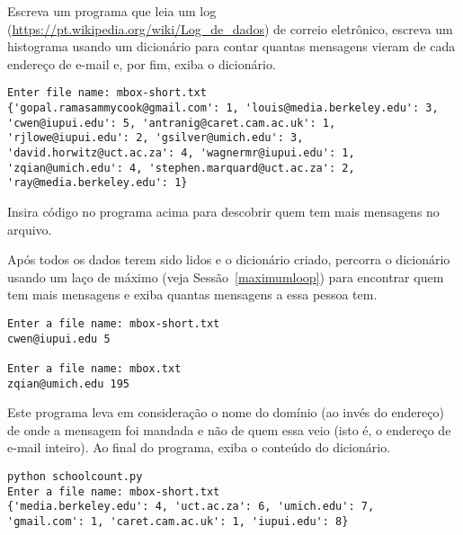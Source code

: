 \begin{ex}
Escreva um programa que leia um log (\url{https://pt.wikipedia.org/wiki/Log_de_dados}) de correio eletrônico, escreva um histograma usando um dicionário para contar quantas mensagens vieram de cada endereço de e-mail e, por fim, exiba o dicionário.

\beforeverb
\begin{verbatim}
Enter file name: mbox-short.txt
{'gopal.ramasammycook@gmail.com': 1, 'louis@media.berkeley.edu': 3,
'cwen@iupui.edu': 5, 'antranig@caret.cam.ac.uk': 1,
'rjlowe@iupui.edu': 2, 'gsilver@umich.edu': 3,
'david.horwitz@uct.ac.za': 4, 'wagnermr@iupui.edu': 1,
'zqian@umich.edu': 4, 'stephen.marquard@uct.ac.za': 2,
'ray@media.berkeley.edu': 1}
\end{verbatim}
\afterverb
\end{ex}

\begin{ex}
Insira código no programa acima para descobrir quem tem mais mensagens no arquivo.

Após todos os dados terem sido lidos e o dicionário criado, percorra o dicionário usando um laço de máximo (veja Sessão~\ref{maximumloop}) para encontrar quem tem mais mensagens e exiba quantas mensagens a essa pessoa tem.

\beforeverb
\begin{verbatim}
Enter a file name: mbox-short.txt
cwen@iupui.edu 5

Enter a file name: mbox.txt
zqian@umich.edu 195
\end{verbatim}
\afterverb
\end{ex}

\begin{ex}
Este programa leva em consideração o nome do domínio (ao invés do endereço) de onde a mensagem foi mandada e não de quem essa veio (isto é, o endereço de e-mail inteiro). Ao final do programa, exiba o conteúdo do dicionário.

\beforeverb
\begin{verbatim}
python schoolcount.py
Enter a file name: mbox-short.txt
{'media.berkeley.edu': 4, 'uct.ac.za': 6, 'umich.edu': 7,
'gmail.com': 1, 'caret.cam.ac.uk': 1, 'iupui.edu': 8}
\end{verbatim}
\afterverb
\end{ex}
